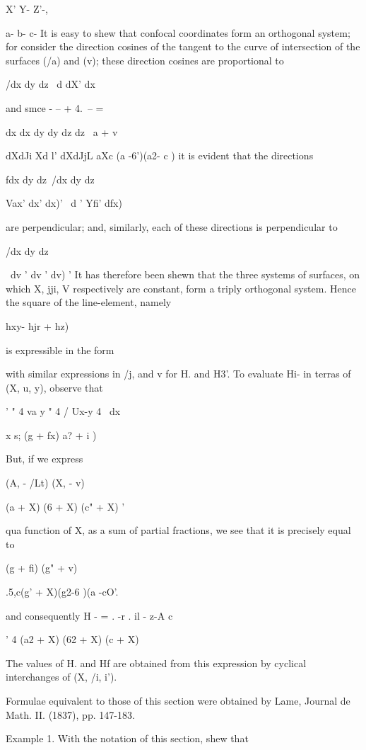 {{X' Y- Z'-,

a- b- c- It is easy to shew that confocal coordinates form an
orthogonal system; for consider the direction cosines of the tangent
to the curve of intersection of the surfaces (/a) and (v); these
direction cosines are proportional to

/dx dy dz \ d dX' dx

and smce - -- + 4.\ -- = %

dx dx dy dy dz dz \ a + v

dXdJi Xd l' dXdJjL aXc (a -6')(a2- c ) it is evident that the
directions

fdx dy dz\ /dx dy dz\

Vax' dx' dx)' \ d ' Yfi' dfx)

are perpendicular; and, similarly, each of these directions is
perpendicular to

/dx dy dz\

\ dv ' dv ' dv) ' It has therefore been shewn that the three systems
of surfaces, on which X, jji, V respectively are constant, form a
triply orthogonal system. Hence the square of the line-element, namely

 hxy- hjr + hz)\

is expressible in the form

%
%

with similar expressions in /j, and v for H. and H3'. To evaluate Hi-
in terras of (X, u, y), observe that

' " 4 va y " 4 / Ux-y 4 \ dx

 x s; (g + fx) a? + i )

But, if we express

(A, - /Lt) (X, - v)

(a + X) (6 + X) (c" + X) '

qua function of X, as a sum of partial fractions, we see that it is
precisely equal to

  (g + fi) (g" + v)

 .5,c(g' + X)(g2-6 )(a -cO'.

and consequently H - = . -r . il - z-A c 

  ' 4 (a2 + X) (62 + X) (c + X)

The values of H. and Hf are obtained from this expression by cyclical
interchanges of (X, /i, i').

Formulae equivalent to those of this section were obtained by Lame,
Journal de Math. II. (1837), pp. 147-183.

Example 1. With the notation of this section, shew that

}}
